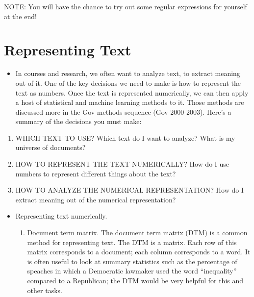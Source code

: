 \documentclass[]{book}
\providecommand{\tightlist}{%
  \setlength{\itemsep}{0pt}\setlength{\parskip}{0pt}}
\theoremstyle{definition}
\theoremstyle{definition}
\theoremstyle{definition}
\theoremstyle{remark}
\begin{document}
NOTE: You will have the chance to try out some regular expressions for
yourself at the end!

\section{Representing Text}\label{representing-text}

\begin{itemize}
\tightlist
\item
  In courses and research, we often want to analyze text, to extract
  meaning out of it. One of the key decisions we need to make is how to
  represent the text as numbers. Once the text is represented
  numerically, we can then apply a host of statistical and machine
  learning methods to it. Those methods are discussed more in the Gov
  methods sequence (Gov 2000-2003). Here's a summary of the decisions
  you must make:
\end{itemize}

\begin{enumerate}
\def\labelenumi{\arabic{enumi}.}
\tightlist
\item
  WHICH TEXT TO USE? Which text do I want to analyze? What is my
  universe of documents?
\item
  HOW TO REPRESENT THE TEXT NUMERICALLY? How do I use numbers to
  represent different things about the text?
\item
  HOW TO ANALYZE THE NUMERICAL REPRESENTATION? How do I extract meaning
  out of the numerical representation?
\end{enumerate}

\begin{itemize}
\item
  Representing text numerically.

  \begin{enumerate}
  \def\labelenumi{\arabic{enumi}.}
  \tightlist
  \item
    Document term matrix. The document term matrix (DTM) is a common
    method for representing text. The DTM is a matrix. Each row of this
    matrix corresponds to a document; each column corresponds to a word.
    It is often useful to look at summary statistics such as the
    percentage of speaches in which a Democratic lawmaker used the word
    ``inequality'' compared to a Republican; the DTM would be very
    helpful for this and other tasks.
  \end{enumerate}
\end{itemize}
\end{document}
